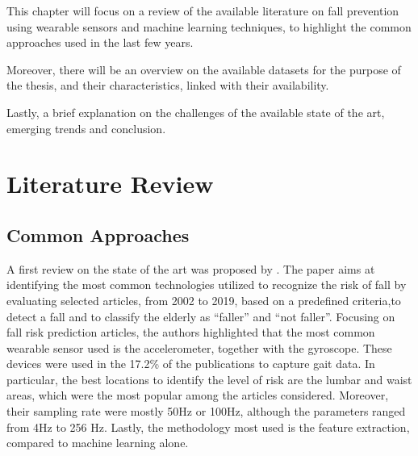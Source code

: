 This chapter will focus on a review of the available literature on fall prevention using wearable sensors and machine learning techniques, to highlight the common approaches used in the last few years.

Moreover, there will be an overview on the available datasets for the purpose of the thesis, and their characteristics, linked with their availability.

Lastly, a brief explanation on the challenges of the available state of the art, emerging trends and conclusion.
\section{Literature Review}
\subsection{Common Approaches}
A first review on the state of the art was proposed by \cite{FallRiskAssessment_WearableSensors_SystematicReview}. 
The paper aims at identifying the most common technologies utilized to recognize the risk of fall by evaluating selected articles, 
from 2002 to 2019, based on a predefined criteria,to detect a fall and to classify the elderly as \enquote{faller} and \enquote{not faller}.  
Focusing on fall risk prediction articles, the authors highlighted that the most common wearable sensor used is the accelerometer, together with the gyroscope. These devices were used in the 17.2\% of the publications to capture gait data. In particular, the best locations to identify the level of risk are the lumbar and waist areas, which were the most popular among the articles considered. Moreover, their sampling rate were mostly 50Hz or 100Hz, although the parameters ranged from 4Hz to 256 Hz. 
Lastly, the methodology most used is the feature extraction, compared to machine learning alone. \\

